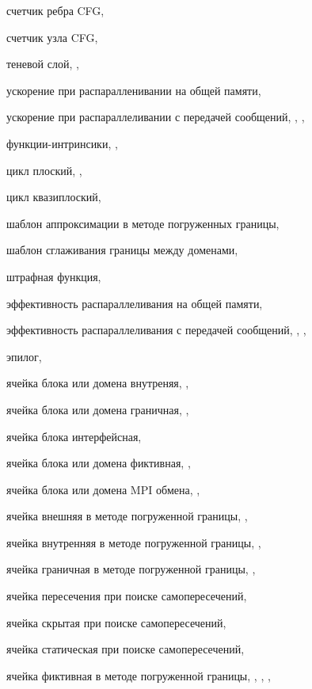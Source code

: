 счетчик ребра CFG, \pageref{term:counter_edge}

счетчик узла CFG, \pageref{term:counter_node}

теневой слой, \pageref{term:block_shadow_layer}, \pageref{term:block_shadow_layer2}

ускорение при распаралленивании на общей памяти, \pageref{term:shr_speedup}

ускорение при распараллеливании с передачей сообщений, \pageref{term:msg_speedup}, \pageref{term:msg_speedup2}, \pageref{term:msg_speedup3}

функции-интринсики, \pageref{term:intrinsic}, \pageref{term:intrinsic2}

цикл плоский, \pageref{term:flat_loop}, \pageref{term:flat_loop2}

цикл квазиплоский, \pageref{term:flat_kvazy_flat}

шаблон аппроксимации в методе погруженных границы, \pageref{term:ibm_template}

шаблон сглаживания границы между доменами, \pageref{term:smooth_template}

штрафная функция, \pageref{term:penalty_function}

эффективность распараллеливания на общей памяти, \pageref{term:shr_eff}

эффективность распараллеливания с передачей сообщений, \pageref{term:msg_eff}, \pageref{term:msg_eff2}, \pageref{term:msg_eff3}

эпилог, \pageref{term:epilog}

ячейка блока или домена внутреняя, \pageref{term:cell_block_inner}, \pageref{term:cell_block_inner2}

ячейка блока или домена граничная, \pageref{term:cell_block_border}, \pageref{term:cell_block_border2}

ячейка блока интерфейсная, \pageref{term:cell_block_interface}

ячейка блока или домена фиктивная, \pageref{term:cell_block_ghost}, \pageref{term:cell_block_ghost2}

ячейка блока или домена MPI обмена, \pageref{term:cell_block_mpi}, \pageref{term:cell_block_mpi2}

ячейка внешняя в методе погруженной границы, \pageref{term:cell_ibm_outer}, \pageref{term:cell_ibm_outer2}

ячейка внутренняя в методе погруженной границы, \pageref{term:cell_ibm_innner}, \pageref{term:cell_ibm_innner2}

ячейка граничная в методе погруженной границы, \pageref{term:cell_ibm_border}, \pageref{term:cell_ibm_border2}

ячейка пересечения при поиске самопересечений, \pageref{term:cell_intersect}

ячейка скрытая при поиске самопересечений, \pageref{term:cell_hidden}

ячейка статическая при поиске самопересечений, \pageref{term:cell_static}

ячейка фиктивная в методе погруженной границы, \pageref{term:cell_ibm_ghost}, \pageref{term:cell_ibm_ghost2}, \pageref{term:cell_ibm_ghost3}, \pageref{term:cell_ibm_ghost4}
